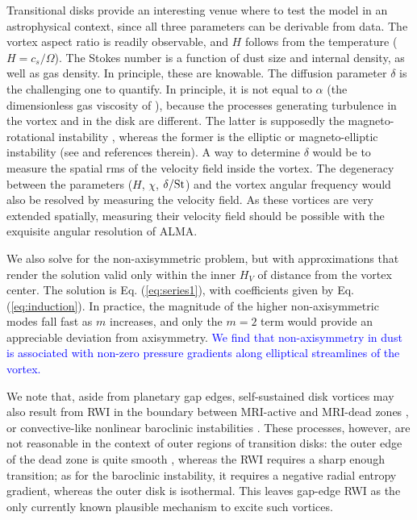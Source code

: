 \documentclass[apj]{emulateapj}
\def\blue#1{\textcolor{blue}{#1}}
\newcommand{\Eq}[1]{Eq. (\ref{#1})}
\newcommand{\eq}[1]{\Eq{#1}}
\newcommand{\St}{{\rm St}}
\begin{document}
Transitional disks provide an interesting venue where to test the
model in an astrophysical context, since all three parameters can be
derivable from data. The vortex aspect ratio is readily observable,
and $H$ follows from the temperature ($H=c_s/\varOmega$). The Stokes number is a function of
dust size and internal density, as well as gas density. In principle,
these are knowable. The diffusion parameter $\delta$ is the
challenging one to quantify. In principle, it is not equal to
$\alpha$ (the dimensionless gas viscosity of
\citealt{Shakura-Sunyaev73}), because the processes generating turbulence in the
vortex and in the disk are different. The latter is supposedly the
magneto-rotational instability \citep[MRI,][]{Balbus-Hawley91}, whereas the former is the elliptic or
magneto-elliptic instability (see \citealt{Lyra13} and references
therein). A way to determine $\delta$ would be to measure the spatial rms of
the velocity field inside the vortex. The degeneracy between the
parameters ($H$, $\chi$, $\delta/\St$) and the vortex angular frequency
would also be resolved by measuring the velocity field. As these
vortices are very extended spatially, measuring their velocity field
should be possible with the exquisite angular resolution of ALMA.

We also solve for the non-axisymmetric problem, but with
approximations that render the solution valid only within 
the inner $H_V$ of distance from the vortex center. The solution is
\eq{eq:series1}, with coefficients given by \eq{eq:induction}. In practice, the magnitude
of the higher non-axisymmetric modes fall fast as $m$ increases, and 
only the $m=2$ term would provide an appreciable deviation from
axisymmetry. \blue{We find that non-axisymmetry in dust 
is associated with non-zero pressure gradients along elliptical streamlines of the vortex.}

We note that, aside from planetary gap edges, self-sustained disk
vortices may also result from RWI in the boundary between MRI-active and MRI-dead zones \citep{Varniere-Tagger06,Lyra08,Lyra09a,Lyra-MacLow12}, or
convective-like nonlinear baroclinic instabilities \citep{Klahr-Bodenheimer03,Klahr04,Petersen07a,Petersen07b,Lesur-Papaloizou10,Lyra-Klahr11,Raettig13}. 
These processes, however, are not reasonable in the context of outer
regions of transition disks: the outer edge of the dead zone is quite smooth
\citep{Dzyurkevich13,Landry13}, whereas the RWI requires a 
sharp enough transition; as for the baroclinic instability, it
requires a negative radial entropy gradient, whereas the outer disk is
isothermal. This leaves gap-edge RWI as the only currently known plausible mechanism to excite such vortices. 
\end{document}
